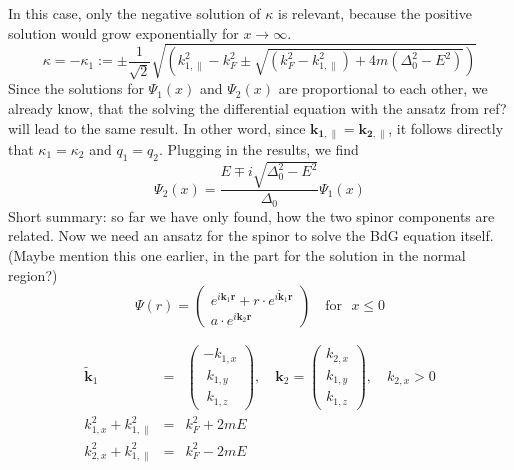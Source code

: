 In this case, only the negative solution of $\kappa$ is relevant, because the positive solution would grow exponentially for $x \rightarrow \infty$.
\begin{equation}
\kappa = - \kappa_1 := \pm \frac{1}{\sqrt{2}}\sqrt{\left( k_{1, \parallel}^2 - k_F^2 \pm \sqrt{ (k_F^2 - k_{1, \parallel}^2) + 4m(\Delta_0^2 - E^2)} \right)}
\end{equation}
Since the solutions for $\Psi_1 \left( x \right)$ and $\Psi_2 \left( x \right)$ are proportional to each other, we already know, that the solving the differential equation with the ansatz from ref? will lead to the same result. In other word, since $\mathbf{k_{1, \parallel}} = \mathbf{k_{2, \parallel}}$, it follows directly that $\kappa_1 = \kappa_2$ and $q_1 = q_2$.
Plugging in the results, we find
\begin{equation}
\Psi_2 \left( x \right) = \frac{E \mp i \sqrt{\Delta_0^2 - E^2}}{\Delta_0} \Psi_1 \left( x \right)
\end{equation}
Short summary: so far we have only found, how the two spinor components are related. Now we need an ansatz for the spinor to solve the BdG equation itself. (Maybe mention this one earlier, in the part for the solution in the normal region?)
\begin{equation}
\Psi \left( r \right) = \begin{pmatrix}
e^{i \mathbf{k}_1 \mathbf{r}} + r \cdot e^{i \tilde{\mathbf{k}}_1 \mathbf{r}} \\
a \cdot e^{i \mathbf{k}_2 \mathbf{r}}
\end{pmatrix} \quad \text{for ~} x \leq 0 
\end{equation}

\begin{eqnarray}
\tilde{\mathbf{k}}_1  &=& \begin{pmatrix} -k_{1, x} \\ ~k_{1, y}\\ ~k_{1, z} \end{pmatrix}, \quad
\mathbf{k}_2  = \begin{pmatrix} k_{2, x} \\ k_{1, y}\\ k_{1, z} \end{pmatrix}, \quad k_{2, x} > 0 \\
k_{1, x}^2 + k_{1, \parallel}^2 &=& k_F^2 + 2mE \\
k_{2, x}^2 + k_{1, \parallel}^2 &=& k_F^2 - 2mE 
\end{eqnarray}

